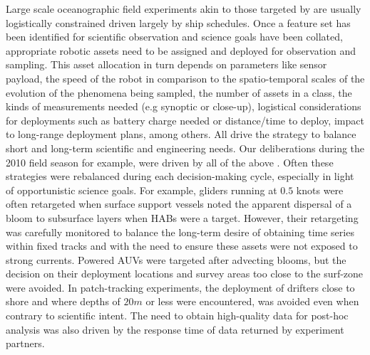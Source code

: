 Large scale oceanographic field experiments akin to those targeted by
\can are usually logistically constrained driven largely by ship
schedules.  Once a feature set has been identified for scientific
observation and science goals have been collated, appropriate robotic
assets need to be assigned and deployed for observation and
sampling. This asset allocation in turn depends on parameters like
sensor payload, the speed of the robot \situ in comparison to the
spatio-temporal scales of the evolution of the phenomena being
sampled, the number of assets in a class, the kinds of measurements
needed (e.g synoptic or close-up), logistical considerations for
deployments such as battery charge needed or distance/time to deploy,
impact to long-range deployment plans, among others. All drive the
strategy to balance short and long-term scientific and engineering
needs. Our \can deliberations during the 2010 field season for
example, were driven by all of the above 
\cite{das11}. Often these strategies were rebalanced during each
decision-making cycle, especially in light of opportunistic science
goals. For example, gliders running at $0.5$ knots were often
retargeted when surface support vessels noted the apparent dispersal
of a bloom to subsurface layers when HABs were a \can target. However,
their retargeting was carefully monitored to balance the long-term
desire of obtaining time series within fixed tracks and with the need
to ensure these assets were not exposed to strong currents. Powered
AUVs were targeted after advecting blooms, but the decision on their
deployment locations and survey areas too close to the surf-zone were
avoided. In patch-tracking experiments, the deployment of drifters
close to shore and where depths of $20m$ or less were encountered, was
avoided even when contrary to scientific intent. The need to obtain
high-quality data for post-hoc analysis was also driven by the
response time of data returned by experiment partners.

